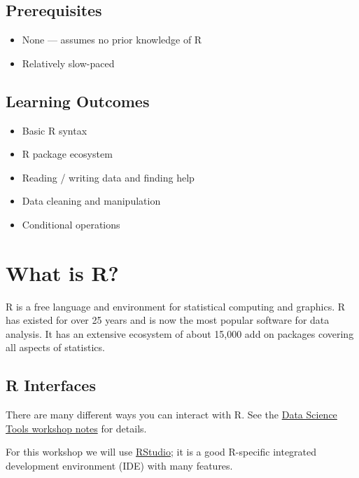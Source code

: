 \documentclass[]{book}
\providecommand{\tightlist}{%
  \setlength{\itemsep}{0pt}\setlength{\parskip}{0pt}}
\begin{document}
\hypertarget{prerequisites}{%
\subsection{Prerequisites}\label{prerequisites}}

\begin{itemize}
\tightlist
\item
  None --- assumes no prior knowledge of R
\item
  Relatively slow-paced
\end{itemize}

\hypertarget{learning-outcomes}{%
\subsection{Learning Outcomes}\label{learning-outcomes}}

\begin{itemize}
\tightlist
\item
  Basic R syntax
\item
  R package ecosystem
\item
  Reading / writing data and finding help
\item
  Data cleaning and manipulation
\item
  Conditional operations
\end{itemize}

\hypertarget{what-is-r}{%
\section{What is R?}\label{what-is-r}}

R is a free language and environment for statistical computing and graphics.
R has existed for over 25 years and is now the most popular software for
data analysis. It has an extensive ecosystem of about 15,000 add on packages
covering all aspects of statistics.

\hypertarget{r-interfaces}{%
\subsection{R Interfaces}\label{r-interfaces}}

There are many different ways you can interact with R. See the
\href{./DataScienceTools.html}{Data Science Tools workshop notes}
for details.

For this workshop we will use \href{https://rstudio.com/}{RStudio}; it is a good
R-specific integrated development environment (IDE) with many features.
\end{document}
